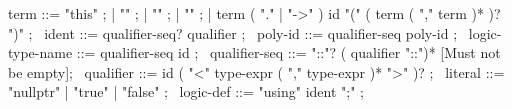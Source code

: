 \begin{syntax}
term ::= "this" ;
  | "\this" ;
  | "\count" ;
  | "\data" ;
  | term ( "." | "->" ) id "(" ( term ( "," term )* )? ")" ;
\
ident ::=  qualifier-seq? qualifier ;
\
poly-id ::= qualifier-seq poly-id ;
\
logic-type-name ::= qualifier-seq id ;
\
qualifier-seq ::= "::"? ( qualifier "::")* [Must not be empty];
\
qualifier ::= id ( "<" type-expr ( "," type-expr )* ">" )? ;
\
literal ::= "nullptr" | "true" | "false" ;
\
logic-def ::= "using" ident ";" ;
\end{syntax}
